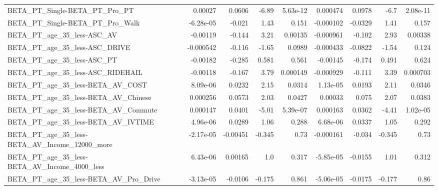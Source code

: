 \begin{tabular}{lrrrrrrrr}
BETA\_PT\_Single-BETA\_PT\_Pro\_PT                      &     0.00027 &       0.0606 &     -6.89 & 5.63e-12 &   0.000474 &      0.0978 &         -6.7 &      2.08e-11 \\
BETA\_PT\_Single-BETA\_PT\_Pro\_Walk                    &   -6.28e-05 &       -0.021 &      1.43 &    0.151 &  -0.000102 &     -0.0329 &         1.41 &         0.157 \\
BETA\_PT\_age\_35\_less-ASC\_AV                         &    -0.00119 &       -0.144 &      3.21 &  0.00135 &  -0.000961 &      -0.102 &         2.93 &       0.00338 \\
BETA\_PT\_age\_35\_less-ASC\_DRIVE                      &   -0.000542 &       -0.116 &     -1.65 &   0.0989 &  -0.000433 &     -0.0822 &        -1.54 &         0.124 \\
BETA\_PT\_age\_35\_less-ASC\_PT                         &    -0.00182 &       -0.285 &     0.581 &    0.561 &   -0.00145 &      -0.174 &        0.491 &         0.624 \\
BETA\_PT\_age\_35\_less-ASC\_RIDEHAIL                   &    -0.00118 &       -0.167 &      3.79 & 0.000149 &  -0.000929 &      -0.111 &         3.39 &      0.000703 \\
BETA\_PT\_age\_35\_less-BETA\_AV\_COST                   &    8.09e-06 &       0.0232 &      2.15 &   0.0314 &   1.13e-05 &      0.0193 &         2.11 &        0.0346 \\
BETA\_PT\_age\_35\_less-BETA\_AV\_Chinese                &    0.000256 &       0.0573 &      2.03 &   0.0427 &    0.00033 &       0.075 &         2.07 &        0.0383 \\
BETA\_PT\_age\_35\_less-BETA\_AV\_Commute                &    0.000147 &       0.0401 &     -5.01 & 5.39e-07 &   0.000163 &      0.0362 &        -4.41 &      1.02e-05 \\
BETA\_PT\_age\_35\_less-BETA\_AV\_IVTIME                 &    4.96e-06 &       0.0289 &      1.06 &    0.288 &   6.68e-06 &      0.0337 &         1.05 &         0.292 \\
BETA\_PT\_age\_35\_less-BETA\_AV\_Income\_12000\_more      &   -2.17e-05 &     -0.00451 &    -0.345 &     0.73 &  -0.000161 &      -0.034 &       -0.345 &          0.73 \\
BETA\_PT\_age\_35\_less-BETA\_AV\_Income\_4000\_less       &    6.43e-06 &      0.00165 &       1.0 &    0.317 &  -5.85e-05 &     -0.0155 &         1.01 &         0.312 \\
BETA\_PT\_age\_35\_less-BETA\_AV\_Pro\_Drive              &   -3.13e-05 &      -0.0106 &    -0.175 &    0.861 &  -5.06e-05 &     -0.0175 &       -0.177 &          0.86 \\

\end{tabular}
